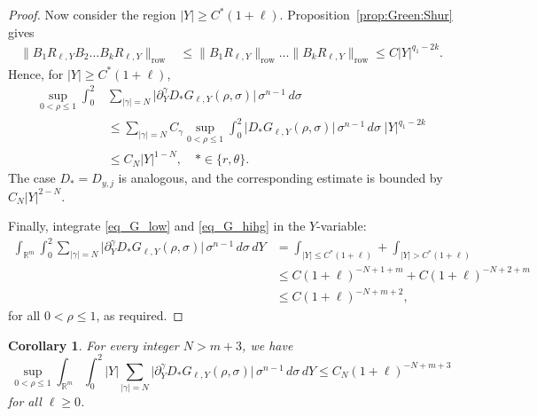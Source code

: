 \documentclass[12pt]{amsart}
\newtheorem{corollary}[theorem]{Corollary}
\begin{document}
\begin{proof}
Now consider the region $|Y|\ge C^*(1+\ell)$. Proposition~\ref{prop:Green:Shur} gives
\begin{align*}
    \bigl\| B_1 R_{\ell,Y} B_2 \dots B_k R_{\ell,Y} \bigr\|_{\mathrm{row}}
    &\le \|B_1 R_{\ell,Y}\|_{\mathrm{row}} \dots \|B_k R_{\ell,Y}\|_{\mathrm{row}}
    \le C|Y|^{q_1-2k}.
\end{align*}
Hence, for $|Y|\ge C^*(1+\ell)$,
\begin{align}\label{eq_G_hihg}
    \sup_{0<\rho\le 1}\int_0^2 &\sum_{|\gamma|=N} \bigl| \partial_Y^\gamma D_* G_{\ell,Y}(\rho,\sigma) \bigr| \, \sigma^{n-1} \, d\sigma \nonumber\\
    &\le \sum_{|\gamma|=N} C_\gamma \sup_{0<\rho\le 1} \int_0^2 \bigl| D_* G_{\ell,Y}(\rho,\sigma) \bigr| \, \sigma^{n-1} \, d\sigma \; |Y|^{q_1-2k} \nonumber\\
    &\le C_N |Y|^{1-N},\quad * \in \{ r, \theta\}.
\end{align}
The case $D_* = D_{y,j}$ is analogous, and the corresponding estimate is bounded by $C_N |Y|^{2-N}$.

Finally, integrate \eqref{eq_G_low} and \eqref{eq_G_hihg} in the $Y$-variable:
\begin{align*}
\int_{\mathbb{R}^m} \int_0^2 \sum_{|\gamma|=N} \bigl| \partial_Y^\gamma D_* G_{\ell,Y}(\rho,\sigma) \bigr| \, \sigma^{n-1} \, d\sigma \, dY
&= \int_{|Y|\le C^*(1+\ell)} + \int_{|Y|>C^*(1+\ell)}\\
&\le C(1+\ell)^{-N+1+m} + C (1+\ell)^{-N+2+m}\\
&\le C (1+\ell)^{-N+m+2},
\end{align*}
for all $0<\rho\le 1$, as required.
\end{proof}

\begin{corollary}\label{cor_weighted_Y_moment_Green}
For every integer $N>m+3$, we have
\begin{equation}\label{eq_weighted_Y_moment_DG}
    \sup_{0<\rho\le 1}
    \int_{\mathbb R^m}
    \int_0^2
    |Y| \sum_{|\gamma|=N}\bigl|\partial_Y^\gamma D_*G_{\ell,Y}(\rho,\sigma)\bigr|\,\sigma^{n-1}\,d\sigma\,dY\le C_N(1+\ell)^{-N+m+3}
\end{equation}
for all $\ell \ge 0$.
\end{corollary}
\end{document}
